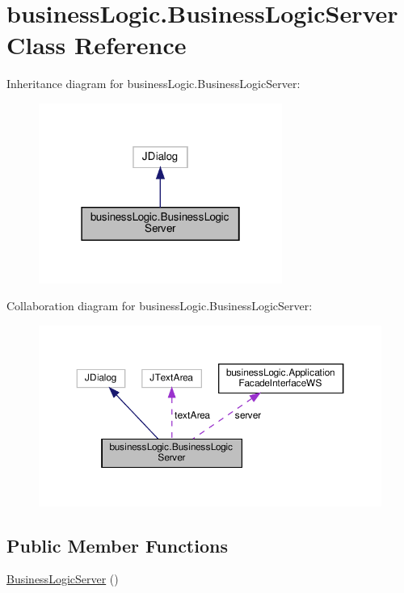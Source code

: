 \hypertarget{classbusiness_logic_1_1_business_logic_server}{}\section{business\+Logic.\+Business\+Logic\+Server Class Reference}
\label{classbusiness_logic_1_1_business_logic_server}


Inheritance diagram for business\+Logic.\+Business\+Logic\+Server\+:
\nopagebreak
\begin{figure}[H]
\begin{center}
\leavevmode
\includegraphics[width=226pt]{classbusiness_logic_1_1_business_logic_server__inherit__graph}
\end{center}
\end{figure}


Collaboration diagram for business\+Logic.\+Business\+Logic\+Server\+:
\nopagebreak
\begin{figure}[H]
\begin{center}
\leavevmode
\includegraphics[width=350pt]{classbusiness_logic_1_1_business_logic_server__coll__graph}
\end{center}
\end{figure}
\subsection*{Public Member Functions}
\begin{DoxyCompactItemize}
\item 
\mbox{\hyperlink{classbusiness_logic_1_1_business_logic_server_a45e022d6b8b68567423caab4157e2784}{Business\+Logic\+Server}} ()
\end{DoxyCompactItemize}
